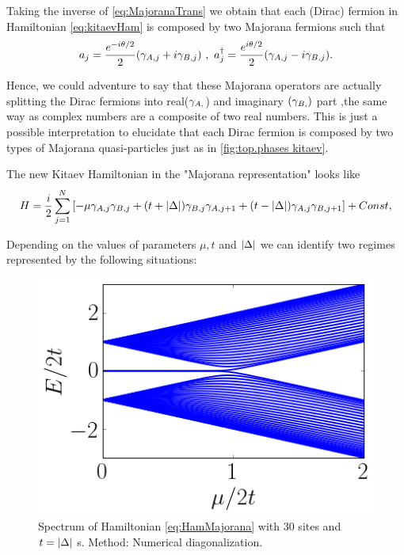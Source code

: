 Taking the inverse of \eqref{eq:MajoranaTrans} we obtain that each  (Dirac) fermion in Hamiltonian \eqref{eq:kitaevHam} is composed by two Majorana fermions such that 
\begin{equation}
a_j = \frac{e^{-i\theta/2}}{2}(\gamma_{A,j}+ i\gamma_{B,j}) \ ,\ a^\dagger_j = \frac{e^{i\theta/2}}{2}(\gamma_{A,j}- i\gamma_{B,j}).
\end{equation}

\noindent Hence, we could adventure to say that these Majorana operators are actually splitting the Dirac fermions into real($\gamma_{A,}$) and imaginary $(\gamma_{B,})$ part ,the same way as complex numbers are a composite of two real numbers. This is just a possible interpretation to elucidate that each Dirac fermion is composed by two types of Majorana quasi-particles just as in \ref{fig:top.phases kitaev}. 

The new Kitaev Hamiltonian in the "Majorana representation" looks like 
\begin{equation}
H = \frac{i}{2} \sum_{j=1}^N \left[ -\mu \gamma_{A,j}\gamma_{B,j}  + (t+ \vert \Delta \vert) \gamma_{B,j}\gamma_{A,j+1} + (t- \vert \Delta \vert) \gamma_{A,j}\gamma_{B,j+1} \right]+Const,\label{eq:HamMajorana}
\end{equation}

Depending on the values of parameters $\mu, t$ and $\vert \Delta \vert$ we can identify two regimes represented by the following situations:





\begin{figure}[t]
    \centering
    \includegraphics[scale=0.65]{IMAGES/Majorana/Spectrum.png}
    \caption{ \label{fig:KitaevSpec} Spectrum of Hamiltonian \ref{eq:HamMajorana} with $30$ sites and $t=\vert \Delta \vert$ s. Method: Numerical diagonalization. \protect {} }
\end{figure}


